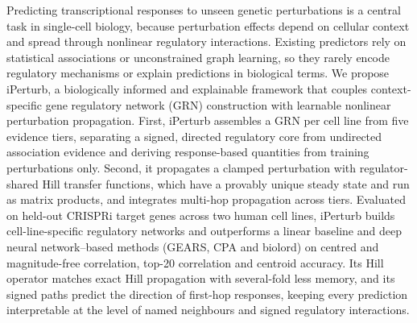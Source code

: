 Predicting transcriptional responses to unseen genetic perturbations is a central task in single-cell biology, because perturbation effects depend on cellular context and spread through nonlinear regulatory interactions.
Existing predictors rely on statistical associations or unconstrained graph learning, so they rarely encode regulatory mechanisms or explain predictions in biological terms.
We propose iPerturb, a biologically informed and explainable framework that couples context-specific gene regulatory network (GRN) construction with learnable nonlinear perturbation propagation.
First, iPerturb assembles a GRN per cell line from five evidence tiers, separating a signed, directed regulatory core from undirected association evidence and deriving response-based quantities from training perturbations only.
Second, it propagates a clamped perturbation with regulator-shared Hill transfer functions, which have a provably unique steady state and run as matrix products, and integrates multi-hop propagation across tiers.
Evaluated on  held-out CRISPRi target genes across two human cell lines, iPerturb builds cell-line-specific regulatory networks and outperforms a linear baseline and deep neural network--based methods (GEARS, CPA and biolord) on centred and magnitude-free correlation, top-20 correlation and centroid accuracy.
Its Hill operator matches exact Hill propagation with several-fold less memory, and its signed paths predict the direction of first-hop responses, keeping every prediction interpretable at the level of named neighbours and signed regulatory interactions.
